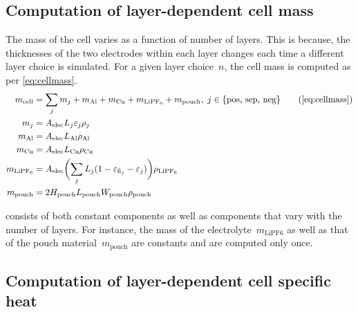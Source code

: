 \subsection{Computation of layer-dependent cell mass}\label{sec:massofonecell}

The mass of the cell varies as a  function of number of layers. This is because,
the thicknesses  of the  two electrodes  within each layer  changes each  time a
different layer choice is simulated. For a given layer choice~$n$, the cell mass
is computed as per \cref{eq:cellmass}.
\begin{subequations}\label{eq:cellmass}
\begin{align}
     m_\mathrm{cell} &= \sum\limits_{j}m_j + m_\mathrm{Al} + m_\mathrm{Cu} + m_\mathrm{LiPF_6} + m_\mathrm{pouch}, \; j \in  \{\text{pos, sep, neg}\}\tag{\ref*{eq:cellmass}}\\
     m_j &=   A_\mathrm{elec}  L_j \varepsilon_j\rho_j\label{eq:mj}\\
      m_\text{Al} &=   A_\mathrm{elec}  L_\text{Al} \rho_\text{Al}\label{eq:Almass}\\
      m_\text{Cu} &=   A_\mathrm{elec}  L_\text{Cu} \rho_\text{Cu}\label{eq:cumass}\\
      m_\mathrm{LiPF_6} &=   A_\mathrm{elec} \biggl(\sum\limits_{j} L_j (1-
      \varepsilon_{\text{fi}_j}-\varepsilon_j)\biggr)\rho_\mathrm{LiPF_6}\label{eq:lipf6mass} \\
      m_\mathrm{pouch} &= 2H_\mathrm{pouch} L_\mathrm{pouch} W_\mathrm{pouch}
      \rho_\mathrm{pouch}\label{eq:pouchmass}
 \end{align}
\end{subequations}


   consists   of  both   constant   components   as  well   as
components   that  vary   with  the   number  of   layers.  For   instance,  the
mass  of  the  electrolyte~$m_\text{LiPF6}$  as   well  as  that  of  the  pouch
material~$m_\text{pouch}$ are constants and are computed only once.

\subsection{Computation of layer-dependent cell specific heat}\label{sec:spheat}

